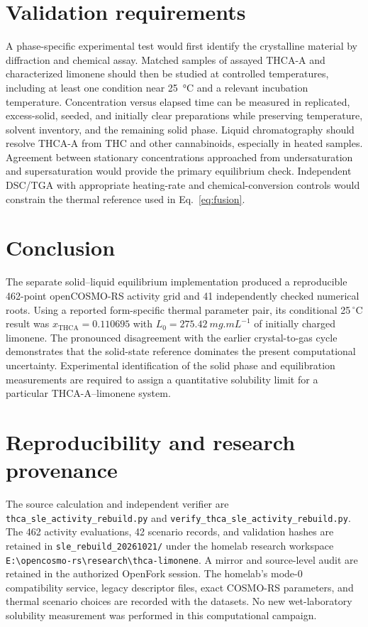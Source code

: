 \documentclass[10pt,a4paper,twocolumn]{article}
\begin{document}
\section{Validation requirements}\label{sec:validation}
A phase-specific experimental test would first identify the crystalline material by diffraction and chemical assay. Matched samples of assayed THCA-A and characterized limonene should then be studied at controlled temperatures, including at least one condition near \SI{25}{\celsius} and a relevant incubation temperature. Concentration versus elapsed time can be measured in replicated, excess-solid, seeded, and initially clear preparations while preserving temperature, solvent inventory, and the remaining solid phase. Liquid chromatography should resolve THCA-A from THC and other cannabinoids, especially in heated samples. Agreement between stationary concentrations approached from undersaturation and supersaturation would provide the primary equilibrium check. Independent DSC/TGA with appropriate heating-rate and chemical-conversion controls would constrain the thermal reference used in Eq.~\ref{eq:fusion}.

\section{Conclusion}\label{sec:conclusion}
The separate solid--liquid equilibrium implementation produced a reproducible 462-point openCOSMO-RS activity grid and 41 independently checked numerical roots. Using a reported form-specific thermal parameter pair, its conditional 25\,$^\circ$C result was $x_{\mathrm{THCA}}=0.110695$ with $L_0=\SI{275.42}{mg.mL^{-1}}$ of initially charged limonene. The pronounced disagreement with the earlier crystal-to-gas cycle demonstrates that the solid-state reference dominates the present computational uncertainty. Experimental identification of the solid phase and equilibration measurements are required to assign a quantitative solubility limit for a particular THCA-A–limonene system.

\section*{Reproducibility and research provenance}\label{sec:provenance}
The source calculation and independent verifier are \texttt{thca\_sle\_activity\_rebuild.py} and \texttt{verify\_thca\_sle\_activity\_rebuild.py}. The 462 activity evaluations, 42 scenario records, and validation hashes are retained in \texttt{sle\_rebuild\_20261021/} under the homelab research workspace \texttt{E:\textbackslash opencosmo-rs\textbackslash research\textbackslash thca-limonene}. A mirror and source-level audit are retained in the authorized OpenFork session. The homelab's mode-0 compatibility service, legacy descriptor files, exact COSMO-RS parameters, and thermal scenario choices are recorded with the datasets. No new wet-laboratory solubility measurement was performed in this computational campaign.
\end{document}

